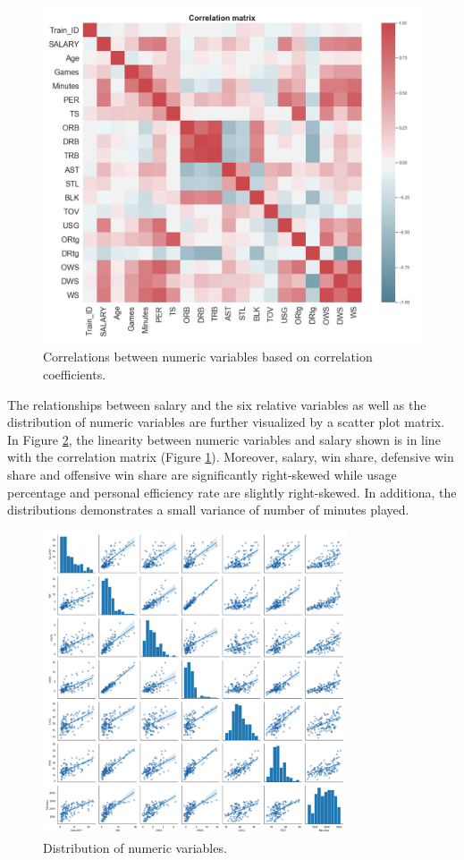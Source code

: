 \documentclass[letterpaper,12pt,twoside,]{pinp}
\begin{document}
\begin{figure}
\includegraphics[width=0.8\linewidth]{correlation.png}
\centering
\caption{Correlations between numeric variables based on correlation coefficients.}
\label{fig:correlation}
\end{figure}

The relationships between salary and the six relative variables as well
as the distribution of numeric variables are further visualized by a
scatter plot matrix. In Figure \ref{fig:scatter}, the linearity between
numeric variables and salary shown is in line with the correlation
matrix (Figure \ref{fig:correlation}). Moreover, salary, win share,
defensive win share and offensive win share are significantly
right-skewed while usage percentage and personal efficiency rate are
slightly right-skewed. In additiona, the distributions demonstrates a
small variance of number of minutes played.

\begin{figure}[h]
\includegraphics[width=0.8\textwidth]{scatter.png}
\centering
\caption{Distribution of numeric variables.}
\label{fig:scatter}
\end{figure}
\end{document}
